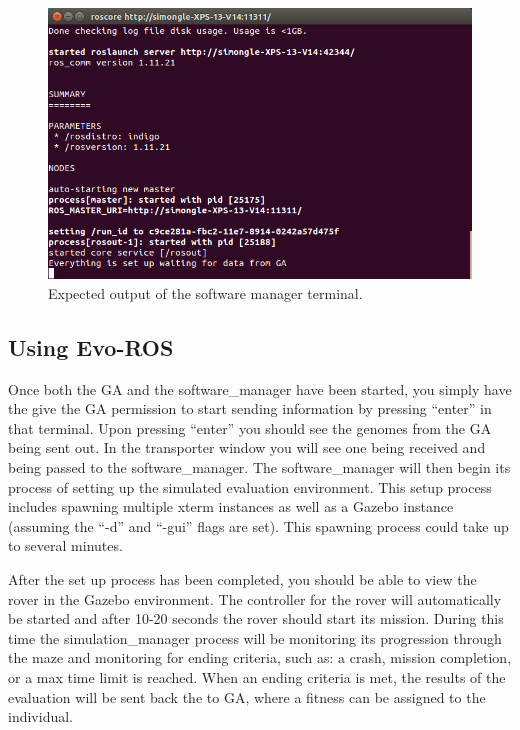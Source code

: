 \documentclass{report}
\begin{document}
\begin{figure}[h]
	\centering
  	\includegraphics[scale=0.33]{Images/software_manager_term_image.png}
  	\caption{Expected output of the software manager terminal.}
  	\label{software_manager_term_image}
\end{figure}


\subsection{Using Evo-ROS}
Once both the GA and the software\_manager have been started, you simply have the give the GA permission to start sending information by pressing ``enter'' in that terminal. Upon pressing ``enter'' you should see the genomes from the GA being sent out. In the transporter window you will see one being received and being passed to the software\_manager. The software\_manager will then begin its process of setting up the simulated evaluation environment. This setup process includes spawning multiple xterm instances as well as a Gazebo instance (assuming the ``-d'' and ``-gui'' flags are set). This spawning process could take up to several minutes.

After the set up process has been completed, you should be able to view the rover in the Gazebo environment. The controller for the rover will automatically be started and after 10-20 seconds the rover should start its mission. During this time the simulation\_manager process will be monitoring its progression through the maze and monitoring for ending criteria, such as: a crash, mission completion, or a max time limit is reached. When an ending criteria is met, the results of the evaluation will be sent back the to GA, where a fitness can be assigned to the individual.
\end{document}
